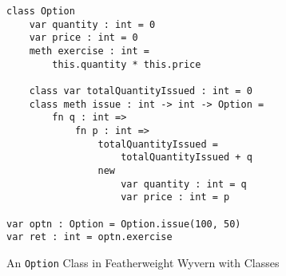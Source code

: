 \begin{figure}
  \centering
\begin{lstlisting}
class Option
	var quantity : int = 0
	var price : int = 0
	meth exercise : int =
		this.quantity * this.price

	class var totalQuantityIssued : int = 0
	class meth issue : int -> int -> Option =
		fn q : int =>
			fn p : int =>
				totalQuantityIssued = 
					totalQuantityIssued + q
				new
					var quantity : int = q
					var price : int = p

var optn : Option = Option.issue(100, 50)
var ret : int = optn.exercise

\end{lstlisting}
\caption{An \texttt{Option} Class in Featherweight Wyvern with Classes}
\label{f-example}
\end{figure}